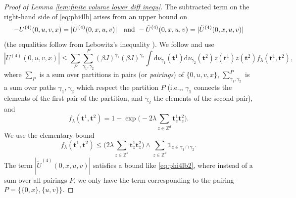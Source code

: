 \documentclass[11pt,a4paper]{article}
\numberwithin{equation}{section}
\theoremstyle{plain}
\theoremstyle{definition}
\newcommand\1{\mathds{1}}
\begin{document}
\begin{proof}[Proof of Lemma \textup{\ref{lem:finite volume lower diff inequ}}]
The subtracted term on the right-hand side of \eqref{eq:phi4lb} arises from
an upper bound on
\begin{equation}
 -U^{(4)}(0,u,v,x)=|U^{(4)}(0,x,u,v)|\quad  \textup{and } -\tilde{U}^{(4)}(0,x,u,v)=|\tilde{U}^{(4)}(0,x,u,v)|
 \end{equation}
(the equalities follow from Lebowitz's inequality \cite{Lebo74}).
We follow \cite[(37)]{Froh82} and use
\begin{equation}\label{eq:phi4lb2}
	|U^{(4)}(0,u,v,x)|\leq \sum_P\sum_{\gamma_1,\gamma_2}^P (\beta J)^{\gamma_1}(\beta J)^{\gamma_2}\int \mathrm{d}\nu_{\gamma_1}(\mathbf{t}^1)\mathrm{d}\nu_{\gamma_2}(\mathbf{t}^2)z(\mathbf{t}^1)z(\mathbf{t}^2)f_\lambda(\mathbf{t}^1,\mathbf{t}^2),
\end{equation}
where
$\sum_P$ is a sum over partitions in pairs (or \emph{pairings}) of $\{0,u,v,x\}$,  $\sum_{\gamma_1,\gamma_2}^P$ is a sum over paths $\gamma_1,\gamma_2$ which respect the partition $P$ (i.e.,, $\gamma_1$ connects the elements of the first pair of the partition, and $\gamma_2$ the elements of the second pair), and
\begin{equation}\label{eq:def f lambda}
	f_{\lambda}(\mathbf{t}^1,\mathbf{t}^2)=1-\exp\Big(-2\lambda \sum_{z\in \mathbb Z^d}\mathbf{t}^1_z\mathbf{t}^2_z\Big).
\end{equation}
We use the elementary bound
\begin{equation}\label{eq:phi4lb3}
	f_{\lambda}(\mathbf{t}^1,\mathbf{t}^2)\leq \Big(2\lambda \sum_{z\in \mathbb Z^d}\mathbf{t}^1_z\mathbf{t}^2_z\Big)\wedge \sum_{z\in \mathbb Z^d}\mathds{1}_{z\in \gamma_1\cap \gamma_2}.
\end{equation}
The term $|\tilde{U}^{(4)}(0,x,u,v)|$ satisfies a bound like \eqref{eq:phi4lb2}, where instead of a sum over all pairings $P$, we only have the term corresponding to the pairing $P=\{\{0,x\},\{u,v\}\}$.


\end{proof}
\end{document}
